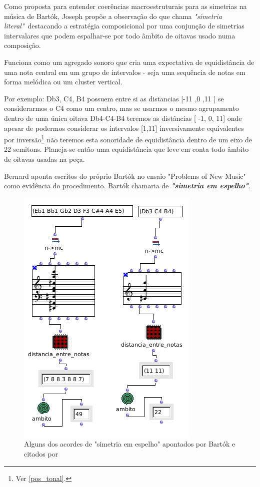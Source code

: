 \documentclass[
	12pt,				%
	openright,			%
	twoside,			%
	a4paper,			%
	english,			%
	french,				%
	spanish,			%
	brazil				%
	]{abntex2}
\begin{document}
Como proposta para entender coerências macroestruturais para as simetrias na música de Bartók, Joseph  propõe a observação do que chama \textit{"simetria literal"}\ destacando a estratégia composicional por uma conjunção de simetrias intervalares que podem espalhar-se por todo âmbito de oitavas usado numa composição.  

Funciona como um  agregado sonoro que cria uma expectativa de equidistância de uma nota central em um grupo de intervalos - seja uma sequência de notas em forma melódica ou um cluster vertical. 

Por exemplo: { Db3, C4, B4} possuem entre si as distancias [-11 ,0 ,11 ] se considerarmos o C4 como um centro, mas se usarmos o mesmo agrupamento dentro de uma única oitava {Db4-C4-B4} teremos as distâncias [ -1, 0, 11] onde apesar de podermos considerar os intervalos [1,11] inversivamente equivalentes por inversão\footnote{Ver \autoref{pos_tonal}.} não teremos esta sonoridade de equidistância dentro de um eixo de 22 semitons. Planeja-se então uma equidistância que leve em conta todo âmbito de oitavas usadas na peça.

Bernard aponta escritos do próprio Bartók no ensaio "Problems of New Music" como evidência do procedimento. Bartók chamaria de \textit{\textbf{"simetria em espelho"}}.


\begin{figure}[!h]
	\caption{\label{fig_simetrialiteral} Alguns dos acordes de "simetria em espelho" apontados por Bartók e citados por }
	\begin{center}
	    \includegraphics[scale=0.6]{axis/simetria_literal.png}
	\end{center}
\end{figure}
\end{document}
